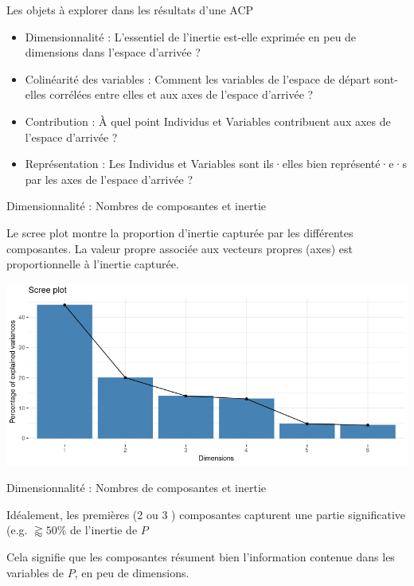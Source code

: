 \documentclass{beamer}
\begin{document}
\begin{frame}{Les objets à explorer dans les résultats d'une ACP}


\begin{itemize}
  \item \alert{Dimensionnalité} : L'essentiel de l'inertie est-elle exprimée en peu de dimensions dans l'espace d'arrivée ? 
  \item \alert{Colinéarité des variables} : Comment les variables de l'espace de départ sont-elles corrélées entre elles et aux axes de l'espace d'arrivée ? 
  \item \alert{Contribution} : À quel point Individus et Variables  contribuent aux axes de l'espace d'arrivée ?
  \item \alert{Représentation} : Les Individus et Variables sont ils·elles bien représenté·e·s  par les axes de l'espace d'arrivée ?

\end{itemize}



\end{frame}





\begin{frame}{Dimensionnalité : Nombres de composantes et inertie}


Le \alert{scree plot} montre la proportion d'inertie capturée par les différentes composantes. 
La valeur propre associée aux vecteurs propres (axes) est proportionnelle à l'inertie capturée.

\centering
\includegraphics[width=\textwidth,keepaspectratio]{img/scree_plot.png}



\end{frame}



\begin{frame}{Dimensionnalité : Nombres de composantes et inertie}


\alert{Idéalement}, les premières (2 ou 3 ) composantes capturent une partie significative (e.g. $\gtrapprox50\%$ de l'inertie de $P$


\medskip


Cela signifie que les composantes \alert{résument bien} l'information contenue dans les variables de $P$, en \alert{peu de dimensions}.

\end{frame}
\end{document}
